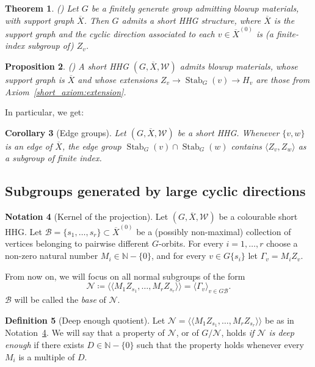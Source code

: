 \documentclass[svgnames]{amsart}
\theoremstyle{plain}
\newtheorem{thm}{Theorem}[section]
\newtheorem{cor}[thm]{Corollary}
\newtheorem{prop}[thm]{Proposition}
\theoremstyle{definition}
\newtheorem{defn}[thm]{Definition}
\newtheorem{notation}[thm]{Notation}
\newcommand{\ov}[1]{\overline{#1}}
\newcommand{\Stab}[2]{\operatorname{Stab}_{#1}(#2)}
\newcommand{\N}{\mathcal{N}}
\newcommand{\B}{\mathcal{B}}
\newcommand{\W}{\mathcal{W}}
\begin{document}
\begin{thm}\label{thm:squidification}(\cite[Theorem 3.10]{Short_HHG:I})
    Let $G$ be a finitely generate group admitting blowup materials, with support graph $\ov X$. Then $G$ admits a short HHG structure, where $\ov X$ is the support graph and the cyclic direction associated to each $v\in\ov{X}^{(0)}$ is (a finite-index subgroup of) $Z_v$.
\end{thm}

\begin{prop}
\label{prop:short_is_squid}
(\cite[Proposition 4.1]{Short_HHG:I})
    A short HHG $(G, \ov X, \W)$ admits blowup materials, whose support graph is $\ov X$ and whose extensions $Z_v\to\Stab{G}{v}\to H_v$ are those from Axiom~\ref{short_axiom:extension}.
\end{prop}

In particular, we get:
\begin{cor}[Edge groups]
    Let $(G, \ov X, \W)$ be a short HHG. Whenever $\{v,w\}$ is an edge of $\ov X$, the \emph{edge group} $\Stab{G}{v}\cap\Stab{G}{w}$ contains $\langle Z_v, Z_w\rangle$ as a subgroup of finite index.
\end{cor}

\subsection{Subgroups generated by large cyclic directions}\label{sec:large_dt}

\begin{notation}[Kernel of the projection]\label{notation:kernel}
Let $(G, \ov{X},\W)$ be a colourable short HHG. Let $\B=\{s_1,\ldots,s_r\}\subset\ov{X}^{(0)}$ be a (possibly non-maximal) collection of vertices belonging to pairwise different $G$-orbits. For every $i=1,\ldots,r$ choose a non-zero natural number $M_i\in \mathbb{N}-\{0\}$, and for every $v\in G\{s_i\}$ let $\Gamma_v=M_i Z_{v}$.

From now on, we will focus on all normal subgroups of the form
$$\N\coloneq\langle\langle M_1Z_{s_1},\ldots, M_rZ_{s_r}\rangle\rangle=\langle \Gamma_v\rangle_{v\in G\B}.$$
$\B$ will be called the \emph{base} of $\N$.
\end{notation}



\begin{defn}[Deep enough quotient]\label{defn:deep_enough}
Let $\N=\langle\langle M_1Z_{s_1},\ldots, M_rZ_{s_r}\rangle\rangle$ be as in Notation~\ref{notation:kernel}. We will say that a property of $\N$, or of $G/\N$, holds \emph{if $\N$ is deep enough} if there exists $D\in \mathbb{N}-\{0\}$ such that the property holds whenever every $M_i$ is a multiple of $D$. 
\end{defn}
\end{document}
